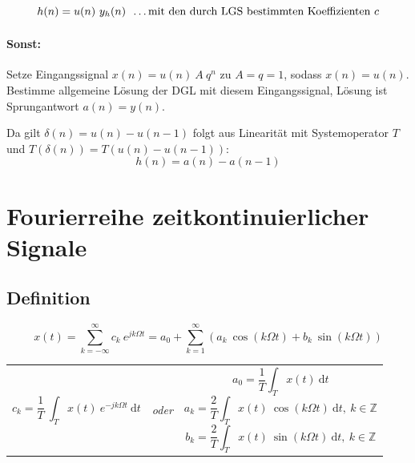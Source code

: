 \documentclass[10pt,a4paper]{article}
\newcommand{\fancythumb}[2]{
	\addthumb{#1}{\large\sffamily\textbf{\space\space#1\vspace{5pt}}}{white}{#2}
}
\begin{document}
\[
	h(n) = u(n) ~ y_h(n) ~~ \textnormal{…mit den durch LGS bestimmten Koeffizienten $c$}
\]

\paragraph{Sonst:} Setze Eingangssignal $x(n) = u(n) ~ A ~ q^n$ zu $A = q = 1$, sodass $x(n) = u(n)$. Bestimme allgemeine Lösung der DGL mit diesem Eingangssignal, Lösung ist Sprungantwort $a(n) = y(n)$.

\vspace{.5em}
Da gilt $\delta(n) = u(n) - u(n - 1)$ folgt aus Linearität mit Systemoperator $T$ und $T(\delta(n)) = T(u(n) - u(n - 1))$:
\[
	h(n) = a(n) - a(n-1)
\]

\section*{Fourierreihe zeitkontinuierlicher Signale}
\fancythumb{FS}{blue}
\subsection*{Definition}
\[
	x(t) = \sum_{k=-\infty}^\infty c_k ~ e^{jk\Omega t} = a_0 + \sum_{k=1}^\infty \left( a_k ~ \cos(k \Omega t) + b_k ~ \sin(k \Omega t) \right)
\]

\begin{centering}
\begin{tabular}{ >{\centering\arraybackslash} m{7cm} >{\centering\arraybackslash} m{1cm} >{\centering\arraybackslash} m{7cm} }

\[
	c_k = \frac{1}{T} ~ \int_T x(t) ~ e^{-jk\Omega t} ~ \mathrm dt
\] & \textit{\sffamily oder} & {
\[
	a_0 = \frac{1}{T} \int_T x(t) ~ \mathrm dt
\]
\[
	a_k = \frac{2}{T} \int_T x(t) ~ \cos(k\Omega t) ~ \mathrm dt, ~ k \in \mathbb Z
\]
\[
	b_k = \frac{2}{T} \int_T x(t) ~ \sin(k\Omega t) ~ \mathrm dt, ~ k \in \mathbb Z
\]
} \\
\end{tabular}
\end{centering}
\end{document}
